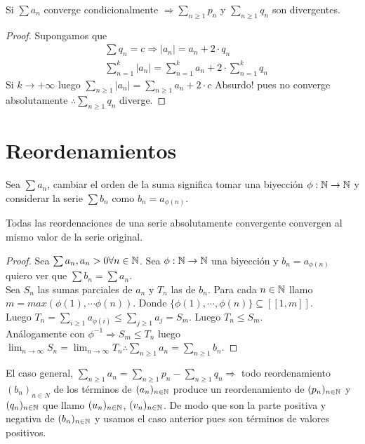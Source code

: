 \begin{theorem}
  Si $\sum a_n$ converge condicionalmente $\Rightarrow \sum_{n \geq 1} p_n$ y $\sum_{n \geq 1} q_n$ son divergentes.

  \begin{proof}
    Supongamos que \begin{align*}
      & \sum q_n = c \Rightarrow |a_n| = a_n + 2 \cdot q_n \\
      & \sum_{n = 1}^k |a_n| = \sum_{n = 1}^k a_n + 2 \cdot \sum_{n = 1}^k q_n
    \end{align*}
    Si $k \to +\infty$ luego $\sum_{n \geq 1} |a_n| = \sum_{n \geq 1} a_n + 2 \cdot c$ Absurdo! pues no converge absolutamente $\therefore \sum_{n \geq 1} q_n$ diverge.
  \end{proof}
\end{theorem}

\section{Reordenamientos}

\begin{definition}
  Sea $\sum a_n$, cambiar el orden de la suma significa tomar una biyección $\phi: \mathbb{N} \to \mathbb{N}$ y considerar la serie $\sum b_n$ como $b_n = a_{\phi(n)}$.
\end{definition}

\begin{theorem}
  Todas las reordenaciones de una serie absolutamente convergente convergen al mismo valor de la serie original.
  \begin{proof}
    Sea $\sum a_n, a_n > 0 \forall n \in \mathbb{N}$. Sea $\phi: \mathbb{N} \to \mathbb{N}$ una biyección y $b_n = a_{\phi(n)}$ quiero ver que $\sum b_n = \sum a_n$. \\
    Sea $S_n$ las sumas parciales de $a_n$ y $T_n$ las de $b_n$. Para cada $n \in \mathbb{N}$ llamo $m = max(\phi(1), \cdots \phi(n))$. Donde $\{ \phi(1), \cdots, \phi(n) \} \subseteq [[1, m]]$. \\
    Luego $T_n = \sum_{i \geq 1} a_{\phi(i)} \leq \sum_{j \geq 1} a_j = S_m$. Luego $T_n \leq S_m$. \\
    Análogamente con $\phi^{-1} \Rightarrow S_m \leq T_n$ luego $\lim_{n \to \infty} S_n = \lim_{n \to \infty} T_n \therefore \sum_{n \geq 1} a_n = \sum_{n \geq 1} b_n$.
  \end{proof}
\end{theorem}

El caso general, $\sum_{n \geq 1} a_n = \sum_{n \geq 1} p_n - \sum_{n \geq 1} q_n \Rightarrow$ todo reordenamiento $(b_n)_{n \in N}$ de los términos de $(a_n)_{n \in \mathbb{N}}$ produce un reordenamiento de $(p_n)_{n \in \mathbb{N}}$ y $(q_n)_{n \in \mathbb{N}}$ que llamo $(u_n)_{n \in \mathbb{N}}$, $(v_n)_{n \in \mathbb{N}}$. De modo que son la parte positiva y negativa de $(b_n)_{n \in \mathbb{N}}$ y usamos el caso anterior pues son términos de valores positivos.

